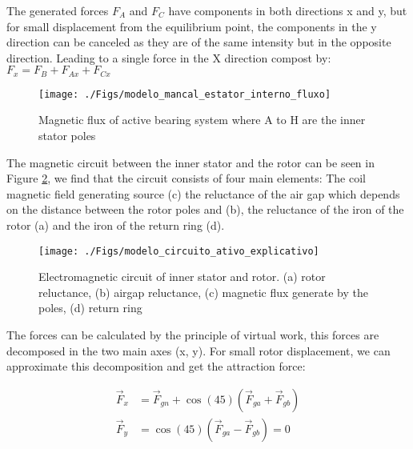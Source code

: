 \documentclass[10pt,fleqn,a4paper,twoside]{article}
\begin{document}
	The generated forces $F_A$ and $F_C$  have components in both directions x and y, but for small displacement from the equilibrium point, the components in the y direction can be canceled as they are of the same intensity but in the opposite direction. Leading to a single force in the X direction compost by: $F_x = F_B + F_{Ax} + F_{Cx}$
	
	\begin{figure}[ht]
		\centering
		\texttt{[image: ./Figs/modelo\_mancal\_estator\_interno\_fluxo]}
		\caption{Magnetic flux of active bearing system where A to H are the inner stator poles}
		\label{fig:modelo:mancal:estator:interno:fluxo}
	\end{figure}
	
	The magnetic circuit between the inner stator and the rotor can be seen in Figure \ref{fig:modelo:circuito:ativo:explicativo}, we find that the circuit consists of four main elements: The coil magnetic field generating source (c) the reluctance of the air gap which depends on the distance between the rotor poles and (b), the reluctance of the iron of the rotor (a) and the iron of the return ring (d).
	
	\begin{figure}[ht]
		\centering
		\texttt{[image: ./Figs/modelo\_circuito\_ativo\_explicativo]}
		\caption{Electromagnetic circuit of inner stator and rotor. (a) rotor reluctance, (b) airgap reluctance, (c) magnetic flux generate by the poles, (d) return ring}
		\label{fig:modelo:circuito:ativo:explicativo}
	\end{figure}
	
	
	The forces can be calculated by the principle of virtual work, this forces are decomposed in the two main axes (x, y). For small rotor displacement, we can approximate this decomposition and get the attraction force: 
	
	\begin{align}
		\vec{F}_x &= \vec{F}_{gn} + \cos(45) (\vec{F}_{ga} + \vec{F}_{gb}) \label{eq:ativo:F:resultante:y} \\
		\vec{F}_y &=  \cos(45) (\vec{F}_{ga} - \vec{F}_{gb}) = 0 \label{eq:ativo:F:resultante:x}
	\end{align}
	
\end{document}
